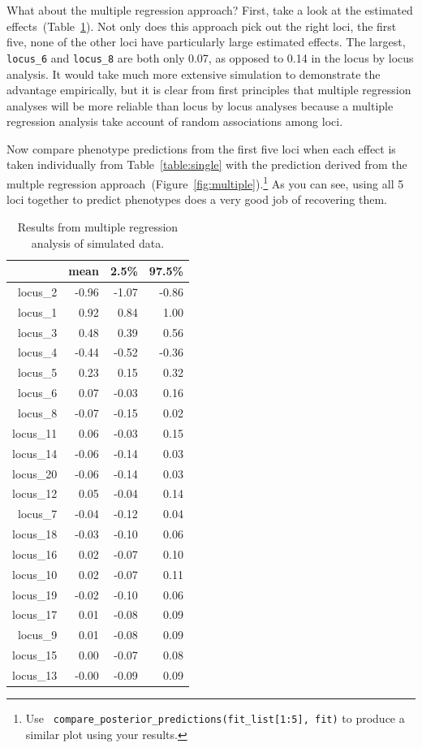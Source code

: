 \documentclass[12pt]{article}
\begin{document}
What about the multiple regression approach? First, take a look at the
estimated effects~(Table~\ref{table:multiple}). Not only does this
approach pick out the right loci, the first five, none of the other
loci have particularly large estimated effects. The largest, {\tt
  locus\_6} and {\tt locus\_8} are both only 0.07, as opposed to 0.14
in the locus by locus analysis. It would take much more extensive
simulation to demonstrate the advantage empirically, but it is clear
from first principles that multiple regression analyses will be more
reliable than locus by locus analyses because a multiple regression
analysis take account of random associations among loci.

Now compare phenotype predictions from the first five loci when each
effect is taken individually from Table~\ref{table:single} with the
prediction derived from the multple regression
approach~(Figure~\ref{fig:multiple}).\footnote{Use {\tt
    compare\_posterior\_predictions(fit\_list[1:5], fit)} to produce a
  similar plot using your results.} As you can see, using all 5 loci
together to predict phenotypes does a very good job of recovering
them. 

\begin{table}[ht]
\centering
\begin{tabular}{rrrr}
  \hline
 & mean & 2.5\% & 97.5\% \\ 
  \hline
locus\_2 & -0.96 & -1.07 & -0.86 \\ 
  locus\_1 & 0.92 & 0.84 & 1.00 \\ 
  locus\_3 & 0.48 & 0.39 & 0.56 \\ 
  locus\_4 & -0.44 & -0.52 & -0.36 \\ 
  locus\_5 & 0.23 & 0.15 & 0.32 \\ 
  locus\_6 & 0.07 & -0.03 & 0.16 \\ 
  locus\_8 & -0.07 & -0.15 & 0.02 \\ 
  locus\_11 & 0.06 & -0.03 & 0.15 \\ 
  locus\_14 & -0.06 & -0.14 & 0.03 \\ 
  locus\_20 & -0.06 & -0.14 & 0.03 \\ 
  locus\_12 & 0.05 & -0.04 & 0.14 \\ 
  locus\_7 & -0.04 & -0.12 & 0.04 \\ 
  locus\_18 & -0.03 & -0.10 & 0.06 \\ 
  locus\_16 & 0.02 & -0.07 & 0.10 \\ 
  locus\_10 & 0.02 & -0.07 & 0.11 \\ 
  locus\_19 & -0.02 & -0.10 & 0.06 \\ 
  locus\_17 & 0.01 & -0.08 & 0.09 \\ 
  locus\_9 & 0.01 & -0.08 & 0.09 \\ 
  locus\_15 & 0.00 & -0.07 & 0.08 \\ 
  locus\_13 & -0.00 & -0.09 & 0.09 \\ 
   \hline
\end{tabular}
\caption{Results from multiple regression analysis of simulated
  data.}\label{table:multiple} 
\end{table}
\end{document}
